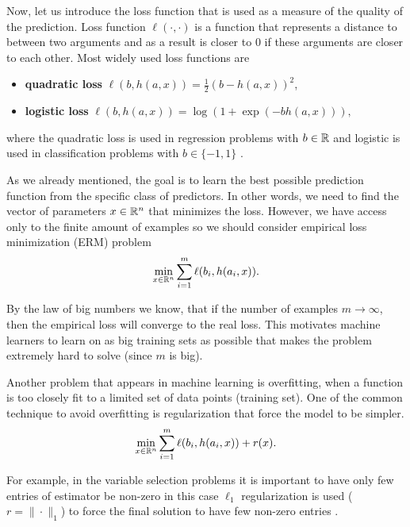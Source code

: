 Now, let us introduce the loss function that is used as a measure of the quality of the prediction. Loss function $\ell(\cdot,\cdot)$ is a function that represents a distance to between two arguments and as a result is closer to $0$ if these arguments are closer to each other. Most widely used loss functions are 
\begin{itemize}
    \item[] {\textbf{quadratic loss}} $\ell(b, h(a,x)) = \frac{1}{2}(b - h(a,x))^2$,
    \item[] {\textbf{logistic loss}} $\ell(b, h(a,x)) = \log(1 + \exp(-bh(a,x))),$
\end{itemize}
where the quadratic loss is used in regression problems with $b\in\mathbb{R}$ \cite{bhattacharya1966estimating} and logistic is used in classification problems with $b\in\{-1,1\}$ \cite{shao2014nonparallel, tang2004granular}.

As we already mentioned, the goal is to learn the best possible prediction function from the specific class of predictors. In other words, we need to find the vector of parameters $x\in\mathbb{R}^n$ that minimizes the loss. However, we have access only to the finite amount of examples so we should consider empirical loss minimization (ERM) problem
\begin{equation}\label{eq:erm}
    \min_{x\in\mathbb{R}^n} \sum_{i=1}^m \ell(b_i, h(a_i,x)).
\end{equation}
    

By the law of big numbers we know, that if the number of examples $m\rightarrow \infty$, then the empirical loss will converge to the real loss. This motivates machine learners to learn on as big training sets as possible that makes the problem extremely hard to solve (since $m$ is big). 

Another problem that appears in machine learning is overfitting, when a function is too closely fit to a limited set of data points (training set). One of the common technique to avoid overfitting is regularization that force the model to be simpler.
\begin{equation}\label{eq:erm_reg}
\min_{x\in\mathbb{R}^n} \sum_{i=1}^m \ell(b_i, h(a_i,x)) + r(x).
\end{equation}

For example, in the variable selection problems it is important to have only few entries of estimator be non-zero in this case $\ell_1$ regularization is used ($r = \|\cdot\|_1$) to force the final solution to have few non-zero entries \cite{bach2012optimization}.

